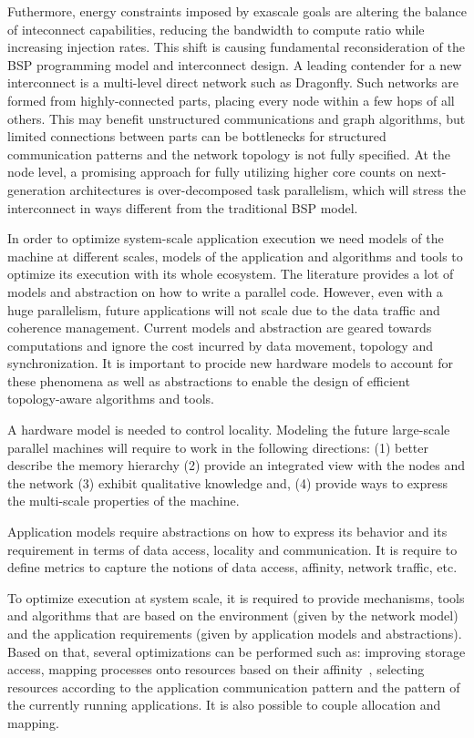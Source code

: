Futhermore, energy constraints imposed by exascale goals are altering the balance of 
inteconnect capabilities, reducing the bandwidth to compute ratio while increasing injection 
rates.  This shift is causing fundamental reconsideration of the BSP programming model and 
interconnect design.  A leading contender for a new interconnect is a multi-level direct 
network such as Dragonfly.  Such networks are formed from highly-connected parts, placing every 
node within a few hops of all others.  This may benefit unstructured communications and graph 
algorithms, but limited connections between parts can be bottlenecks for structured 
communication patterns and the network topology is not fully specified.  At the node level, a 
promising approach for fully utilizing higher core counts on next-generation architectures is 
over-decomposed task parallelism, which will stress the interconnect in ways different from the 
traditional BSP model.


In order to optimize system-scale application execution we need models
of the machine at different scales, models of the application and algorithms
and tools to optimize its execution with its whole ecosystem. 
The literature provides a lot of models and abstraction on how to write a
parallel code. However, even with a huge parallelism, future applications will
not scale due to the data traffic and coherence management. Current models and
abstraction are geared towards computations and ignore the cost incurred by data
movement, topology and synchronization.  It is important to procide new hardware
models to account for these phenomena as well as abstractions to enable the
design of efficient topology-aware algorithms and tools. 

A hardware model is needed to control locality.  Modeling the future large-scale
parallel machines will require to work in the following directions: (1) better
describe the memory hierarchy (2) provide an integrated view with the nodes and
the network (3) exhibit qualitative knowledge and, (4) provide ways to express
the multi-scale properties of the machine.

Application models require abstractions on how to express its behavior and its
requirement in terms of data access, locality and communication.  It is require
to define metrics to capture the notions of data access, affinity, network
traffic, etc. 

To optimize execution at system scale, it is required to provide mechanisms,
tools and algorithms that are based on the environment (given by the network
model) and the application requirements (given by application models and
abstractions). Based on that, several optimizations can be performed such as:
improving storage access, mapping processes onto resources based on their
affinity~\cite{hjm14,DBLP:conf/ics/HoeflerS11,Navauxandal2009}, selecting
resources according to the application communication pattern and the pattern of
the currently running applications. It is also possible to couple allocation and
mapping.


